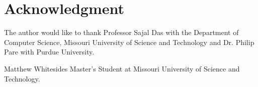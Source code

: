\documentclass[journal,onecolumn]{IEEEtran}
\begin{document}



\section*{Acknowledgment}
The author would like to thank Professor Sajal Das with the Department of Computer Science, Missouri University of Science and Technology and Dr. Philip Pare with Purdue University.

\ifCLASSOPTIONcaptionsoff
  \newpage
\fi




\begin{IEEEbiographynophoto}{Matthew Whitesides}
  Master's Student at Missouri University of Science and Technology.
\end{IEEEbiographynophoto}

\end{document}
